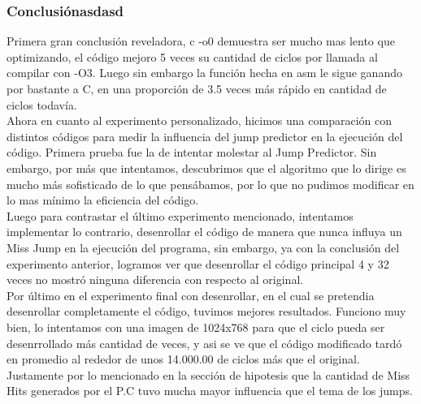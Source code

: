 \subsubsection{Conclusiónasdasd}
 Primera gran conclusión reveladora, c -o0 demuestra ser mucho mas lento que optimizando, el código mejoro 5 veces su cantidad de ciclos por llamada al compilar con -O3.
  Luego sin embargo la función hecha en asm le sigue ganando por bastante a C, en una proporción de 3.5 veces más rápido en cantidad de ciclos todavía.\\
  Ahora en cuanto al experimento personalizado, hicimos una comparación con distintos códigos para medir la influencia del jump predictor en la ejecución del código. Primera prueba fue la de intentar molestar al Jump Predictor. Sin embargo, por más que intentamos, descubrimos que el algoritmo que lo dirige es mucho más sofisticado de lo que pensábamos, por lo que no pudimos modificar en lo mas mínimo la eficiencia del código. \\
   Luego para contrastar el último experimento mencionado, intentamos implementar lo contrario, desenrollar el código de manera que nunca influya un Miss Jump en la ejecución del programa, sin embargo, ya con la conclusión del experimento anterior, logramos ver que desenrollar el código principal 4 y 32 veces no mostró ninguna diferencia con respecto al original. \\ 
   Por último en el experimento final con desenrollar, en el cual se pretendia desenrollar completamente el código, tuvimos mejores resultados. Funciono muy bien, lo intentamos con una imagen de 1024x768 para que el ciclo pueda ser desenrrollado más cantidad de veces, y asi se ve que el código modificado tardó en promedio al rededor de unos 14.000.00 de ciclos más que el original. Justamente por lo mencionado en la sección de hipotesis que la cantidad de Miss Hits generados por el P.C tuvo mucha mayor influencia que el tema de los jumps.
